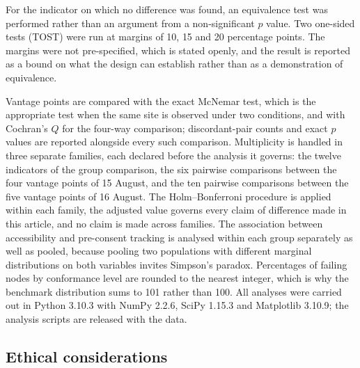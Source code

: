 \documentclass[]{interact}
\begin{document}
For the indicator on which no difference was found, an equivalence test was performed rather than an argument from a non-significant $p$ value. Two one-sided tests (TOST) were run at margins of 10, 15 and 20 percentage points. The margins were not pre-specified, which is stated openly, and the result is reported as a bound on what the design can establish rather than as a demonstration of equivalence.

Vantage points are compared with the exact McNemar test, which is the appropriate test when the same site is observed under two conditions, and with Cochran's $Q$ for the four-way comparison; discordant-pair counts and exact $p$ values are reported alongside every such comparison. Multiplicity is handled in three separate families, each declared before the analysis it governs: the twelve indicators of the group comparison, the six pairwise comparisons between the four vantage points of 15 August, and the ten pairwise comparisons between the five vantage points of 16 August. The Holm--Bonferroni procedure is applied within each family, the adjusted value governs every claim of difference made in this article, and no claim is made across families. The association between accessibility and pre-consent tracking is analysed within each group separately as well as pooled, because pooling two populations with different marginal distributions on both variables invites Simpson's paradox. Percentages of failing nodes by conformance level are rounded to the nearest integer, which is why the benchmark distribution sums to 101 rather than 100. All analyses were carried out in Python 3.10.3 with NumPy 2.2.6, SciPy 1.15.3 and Matplotlib 3.10.9; the analysis scripts are released with the data.

\subsection{Ethical considerations}\label{sec:methods-ethics}
\end{document}
